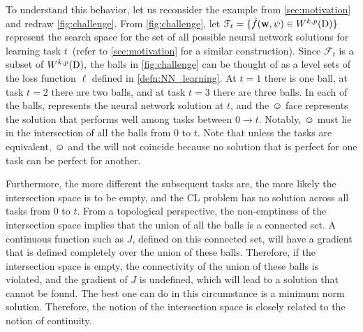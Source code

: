 To understand this behavior, let us reconsider the example from 
\cref{sec:motivation} and redraw \cref{fig:challenge}. 
From \cref{fig:challenge}, let $\mathcal{F}_t = \{\hat{f}(\boldsymbol{\mathrm{w}},\psi)\in W^{k,p}(\mathrm{D})\}$ represent the search space for the set of  all possible neural network solutions for learning task 
$t$~(refer to \cref{sec:motivation} for a similar construction). 
Since $\mathcal{F}_t$ is a subset of $W^{k,p}(\mathrm{D}),$ the balls in \cref{fig:challenge} 
can be thought  of as a level sets of the loss function $\ell$ defined in \cref{defn:NN_learning}. At $t=1$ there is one ball, at task $t=2$ there are two balls, 
and at task $t=3$ there are three balls. In each of the balls,  represents the neural network solution at $t$, and the $\smiley{}$ face 
represents the solution that performs well among tasks 
between $0 \rightarrow t.$  Notably,  $\smiley{}$ must lie in 
the intersection of all the balls from $0$ to $t$. 
Note that unless the tasks are equivalent,  $\smiley{}$ 
and the  will not coincide because no solution 
that is perfect for one task can be perfect for another. 

Furthermore, the more different the subsequent tasks are, the more likely
the intersection space is to be empty, and the CL problem has no solution 
across all tasks from $0$ to $t$.  From a topological perspective, the non-emptiness of the intersection space implies 
that the union of all the balls is a connected set. A continuous 
function such as $J$, defined on this 
connected set, will have a gradient that is 
defined completely over the union of these balls. Therefore, 
if the intersection space is empty, the connectivity of the union
of these balls is violated, and the gradient of $J$ is undefined, which will lead to  a solution that cannot be found. The best one can do in this circumstance is a 
minimum norm solution. Therefore, the notion of the intersection space is closely related to the notion of continuity. 

